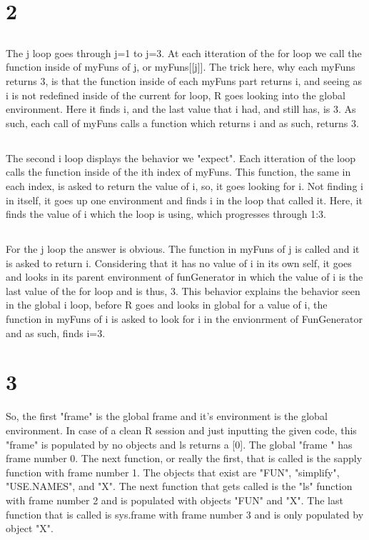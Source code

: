 \section{2}
\subsection{}
The j loop goes through j=1 to j=3. At each itteration of the for loop
we call the function inside of myFuns of j, or myFuns[[j]]. The trick here,
why each myFuns returns 3, is that the function inside of each myFuns part
returns i, and seeing as i is not redefined inside of the current for loop,
R goes looking into the global environment. Here it finds i, and the last value
that i had, and still has, is 3. As such, each call of myFuns calls a function 
which returns i and as such, returns 3.
\subsection{}
The second i loop displays the behavior we "expect". Each itteration of the loop calls the function inside of the ith index of myFuns. This function, the same
in each index, is asked to return the value of i, so, it goes looking for i. Not
finding i in itself, it goes up one environment and finds i in the loop that called it.
Here, it finds the value of i which the loop is using, which progresses through
1:3. 
\subsection{}
For the j loop the answer is obvious. The function in myFuns of j is called
and it is asked to return i. Considering that it has no value of i in its own self, it goes and looks in its parent environment of funGenerator in which the value of i is the last value of the for loop and is thus, 3. This behavior explains the behavior seen in the global i loop, before R goes and looks in global for a value of i, the function in myFuns of i is asked to look for i in the envionrment of FunGenerator and as such, finds i=3. 

\section{3}
So, the first "frame" is the global frame and it's environment is the global
environment. In case of a clean R session and just inputting the given code,
this "frame" is populated by no objects and ls returns a [0]. The global "frame
" has frame number 0. The next function, or really the first, that is called
is the sapply function with frame number 1. The objects that exist are "FUN", 
"simplify", "USE.NAMES", and "X". The next function that gets called is the
"ls" function with frame number 2 and is populated with objects "FUN" and "X".
The last function that is called is sys.frame with frame number 3 and is only
populated by object "X".


